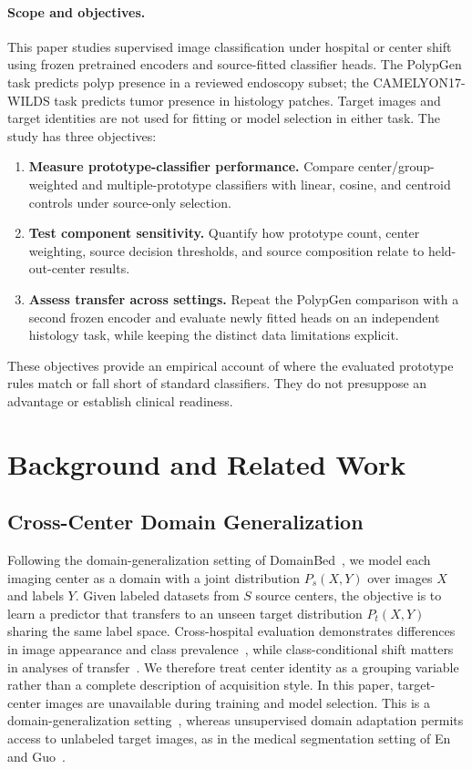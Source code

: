 \paragraph{Scope and objectives.}
This paper studies supervised image classification under hospital or center shift using frozen pretrained encoders and source-fitted classifier heads. The PolypGen task predicts polyp presence in a reviewed endoscopy subset; the CAMELYON17-WILDS task predicts tumor presence in histology patches. Target images and target identities are not used for fitting or model selection in either task. The study has three objectives:
\begin{enumerate}
    \item \textbf{Measure prototype-classifier performance.} Compare center/group-weighted and multiple-prototype classifiers with linear, cosine, and centroid controls under source-only selection.
    \item \textbf{Test component sensitivity.} Quantify how prototype count, center weighting, source decision thresholds, and source composition relate to held-out-center results.
    \item \textbf{Assess transfer across settings.} Repeat the PolypGen comparison with a second frozen encoder and evaluate newly fitted heads on an independent histology task, while keeping the distinct data limitations explicit.
\end{enumerate}
These objectives provide an empirical account of where the evaluated prototype rules match or fall short of standard classifiers. They do not presuppose an advantage or establish clinical readiness.

\section{Background and Related Work}
\label{sec:background}

\subsection{Cross-Center Domain Generalization}
Following the domain-generalization setting of DomainBed~\cite{gulrajani2021domainbed}, we model each imaging center as a domain with a joint distribution $P_s(X,Y)$ over images $X$ and labels $Y$. Given labeled datasets from $S$ source centers, the objective is to learn a predictor that transfers to an unseen target distribution $P_t(X,Y)$ sharing the same label space. Cross-hospital evaluation demonstrates differences in image appearance and class prevalence~\cite{zech2018generalization}, while class-conditional shift matters in analyses of transfer~\cite{zhao2019invariant}. We therefore treat center identity as a grouping variable rather than a complete description of acquisition style. In this paper, target-center images are unavailable during training and model selection. This is a domain-generalization setting~\cite{gulrajani2021domainbed}, whereas unsupervised domain adaptation permits access to unlabeled target images, as in the medical segmentation setting of En and Guo~\cite{en2024dpcl}.

